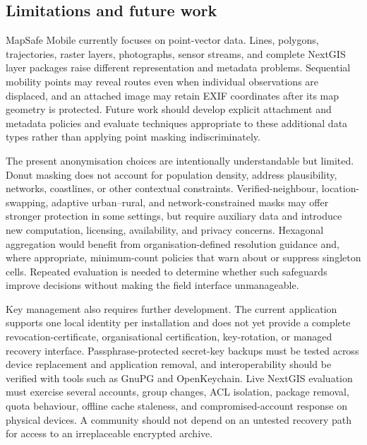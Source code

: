 \documentclass[a4paper,UKenglish,cleveref,autoref,thm-restate]{lipics-v2021}
\begin{document}
\subsection{Limitations and future work}

MapSafe Mobile currently focuses on point-vector data. Lines, polygons, trajectories, raster layers, photographs, sensor streams, and complete NextGIS layer packages raise different representation and metadata problems. Sequential mobility points may reveal routes even when individual observations are displaced, and an attached image may retain EXIF coordinates after its map geometry is protected. Future work should develop explicit attachment and metadata policies and evaluate techniques appropriate to these additional data types rather than applying point masking indiscriminately.

The present anonymisation choices are intentionally understandable but limited. Donut masking does not account for population density, address plausibility, networks, coastlines, or other contextual constraints. Verified-neighbour, location-swapping, adaptive urban--rural, and network-constrained masks may offer stronger protection in some settings, but require auxiliary data and introduce new computation, licensing, availability, and privacy concerns. Hexagonal aggregation would benefit from organisation-defined resolution guidance and, where appropriate, minimum-count policies that warn about or suppress singleton cells. Repeated evaluation is needed to determine whether such safeguards improve decisions without making the field interface unmanageable.

Key management also requires further development. The current application supports one local identity per installation and does not yet provide a complete revocation-certificate, organisational certification, key-rotation, or managed recovery interface. Passphrase-protected secret-key backups must be tested across device replacement and application removal, and interoperability should be verified with tools such as GnuPG and OpenKeychain. Live NextGIS evaluation must exercise several accounts, group changes, ACL isolation, package removal, quota behaviour, offline cache staleness, and compromised-account response on physical devices. A community should not depend on an untested recovery path for access to an irreplaceable encrypted archive.
\end{document}

